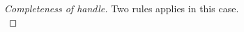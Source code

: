 \begin{proof}[Completeness of handle]
{{      %
      }
      {
      }
      }
      {
      Two rules applies in this case.\\
      {
      }
      {
      }
      }
\end{proof}

